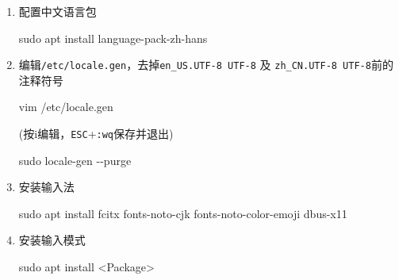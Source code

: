 \documentclass{article}
\newenvironment{Shaded}{}{}
\newcommand{\AttributeTok}[1]{\textcolor[rgb]{0.49,0.56,0.16}{#1}}
\newcommand{\ExtensionTok}[1]{#1}
\newcommand{\FunctionTok}[1]{\textcolor[rgb]{0.02,0.16,0.49}{#1}}
\newcommand{\NormalTok}[1]{#1}
\newcommand{\OperatorTok}[1]{\textcolor[rgb]{0.40,0.40,0.40}{#1}}
\begin{document}
\begin{enumerate}
  \def\labelenumi{\arabic{enumi}.}
  \item
        配置中文语言包

        \begin{Shaded}
          \begin{Highlighting}[]
            \FunctionTok{sudo}\NormalTok{ apt install language{-}pack{-}zh{-}hans}
          \end{Highlighting}
        \end{Shaded}
  \item
        编辑\texttt{/etc/locale.gen}，去掉\texttt{en\_US.UTF-8\ UTF-8} 及
        \texttt{zh\_CN.UTF-8\ UTF-8}前的注释符号

        \begin{Shaded}
          \begin{Highlighting}[]
            \ExtensionTok{vim}\NormalTok{ /etc/locale.gen}
          \end{Highlighting}
        \end{Shaded}

        (按i编辑，\texttt{ESC}+\texttt{:wq}保存并退出)

        \begin{Shaded}
          \begin{Highlighting}[]
            \FunctionTok{sudo}\NormalTok{ locale{-}gen }\AttributeTok{{-}{-}purge}
          \end{Highlighting}
        \end{Shaded}
  \item
        安装输入法

        \begin{Shaded}
          \begin{Highlighting}[]
            \FunctionTok{sudo}\NormalTok{ apt install fcitx fonts{-}noto{-}cjk fonts{-}noto{-}color{-}emoji dbus{-}x11}
          \end{Highlighting}
        \end{Shaded}
  \item
        安装输入模式

        \begin{Shaded}
          \begin{Highlighting}[]
            \FunctionTok{sudo}\NormalTok{ apt install }\OperatorTok{\textless{}}\NormalTok{Package}\OperatorTok{\textgreater{}}
          \end{Highlighting}
        \end{Shaded}


\end{enumerate}
\end{document}
